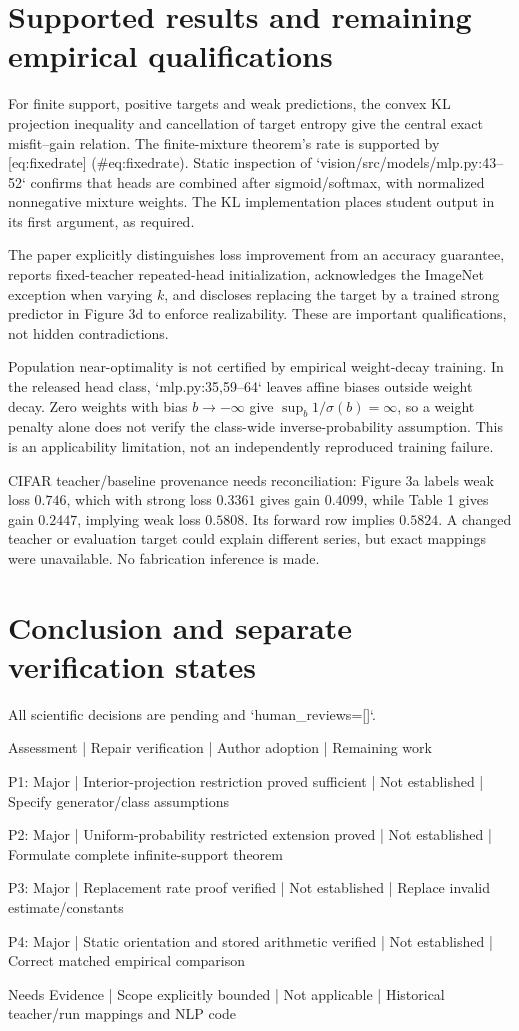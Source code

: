 \documentclass[10pt]{article}
\begin{document}
\section*{Supported results and remaining empirical qualifications}
For finite support, positive targets and weak predictions, the convex KL projection inequality and cancellation of target entropy give the central exact misfit–gain relation. The finite-mixture theorem’s rate is supported by [eq:fixedrate] (\#eq:fixedrate). Static inspection of `vision/src/models/mlp.py:43--52` confirms that heads are combined after sigmoid/softmax, with normalized nonnegative mixture weights. The KL implementation places student output in its first argument, as required.\par
The paper explicitly distinguishes loss improvement from an accuracy guarantee, reports fixed-teacher repeated-head initialization, acknowledges the ImageNet exception when varying \(k\), and discloses replacing the target by a trained strong predictor in Figure 3d to enforce realizability. These are important qualifications, not hidden contradictions.\par
Population near-optimality is not certified by empirical weight-decay training. In the released head class, `mlp.py:35,59--64` leaves affine biases outside weight decay. Zero weights with bias \(b\to-\infty\) give \(\sup_b1/\sigma(b)=\infty\), so a weight penalty alone does not verify the class-wide inverse-probability assumption. This is an applicability limitation, not an independently reproduced training failure.\par
CIFAR teacher/baseline provenance needs reconciliation: Figure 3a labels weak loss \(0.746\), which with strong loss \(0.3361\) gives gain \(0.4099\), while Table 1 gives gain \(0.2447\), implying weak loss \(0.5808\). Its forward row implies \(0.5824\). A changed teacher or evaluation target could explain different series, but exact mappings were unavailable. No fabrication inference is made.\par
\section*{Conclusion and separate verification states}
All scientific decisions are pending and `human\_reviews=[]`.\par
Assessment | Repair verification | Author adoption | Remaining work\par
P1: Major | Interior-projection restriction proved sufficient | Not established | Specify generator/class assumptions\par
P2: Major | Uniform-probability restricted extension proved | Not established | Formulate complete infinite-support theorem\par
P3: Major | Replacement rate proof verified | Not established | Replace invalid estimate/constants\par
P4: Major | Static orientation and stored arithmetic verified | Not established | Correct matched empirical comparison\par
Needs Evidence | Scope explicitly bounded | Not applicable | Historical teacher/run mappings and NLP code\par
\end{document}
